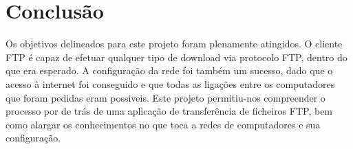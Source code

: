 \section{Conclusão}

Os objetivos delineados para este projeto foram plenamente atingidos. O cliente FTP é capaz de efetuar qualquer tipo de download via protocolo FTP, dentro do que era esperado. A configuração da rede foi também um sucesso, dado que o acesso à internet foi conseguido e que todas as ligações entre os computadores que foram pedidas eram possiveis. 
Este projeto permitiu-nos compreender o processo por de trás de uma aplicação de transferência de ficheiros FTP, bem como alargar os conhecimentos no que toca a redes de computadores e sua configuração.

